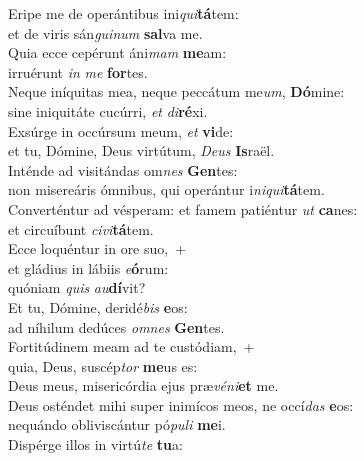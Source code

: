 \evenverse Eripe me de operántibus ini\textit{qui}\textbf{tá}tem:~\*\\
\evenverse et de viris sán\textit{gui}\textit{num} \textbf{sal}va me.\\
\oddverse Quia ecce cepérunt áni\textit{mam} \textbf{me}am:~\*\\
\oddverse irruérunt \textit{in} \textit{me} \textbf{for}tes.\\
\evenverse Neque iníquitas mea, neque peccátum me\textit{um}, \textbf{Dó}mine:~\*\\
\evenverse sine iniquitáte cucúrri, \textit{et} \textit{di}\textbf{ré}xi.\\
\oddverse Exsúrge in occúrsum meum, \textit{et} \textbf{vi}de:~\*\\
\oddverse et tu, Dómine, Deus virtútum, \textit{De}\textit{us} \textbf{Is}raël.\\
\evenverse Inténde ad visitándas om\textit{nes} \textbf{Gen}tes:~\*\\
\evenverse non misereáris ómnibus, qui operántur i\textit{ni}\textit{qui}\textbf{tá}tem.\\
\oddverse Converténtur ad vésperam: et famem patiéntur \textit{ut} \textbf{ca}nes:~\*\\
\oddverse et circuíbunt \textit{ci}\textit{vi}\textbf{tá}tem.\\
\evenverse Ecce loquéntur in ore suo,~+\\
\evenverse  et gládius in lábiis \textit{e}\textbf{ó}rum:~\*\\
\evenverse quóniam \textit{quis} \textit{au}\textbf{dí}vit?\\
\oddverse Et tu, Dómine, deridé\textit{bis} \textbf{e}os:~\*\\
\oddverse ad níhilum dedúces \textit{om}\textit{nes} \textbf{Gen}tes.\\
\evenverse Fortitúdinem meam ad te custódiam,~+\\
\evenverse  quia, Deus, suscép\textit{tor} \textbf{me}us es:~\*\\
\evenverse Deus meus, misericórdia ejus præ\textit{vé}\textit{ni}\textbf{et} me.\\
\oddverse Deus osténdet mihi super inimícos meos, ne occí\textit{das} \textbf{e}os:~\*\\
\oddverse nequándo obliviscántur pó\textit{pu}\textit{li} \textbf{me}i.\\
\evenverse Dispérge illos in virtú\textit{te} \textbf{tu}a:~\*\\
